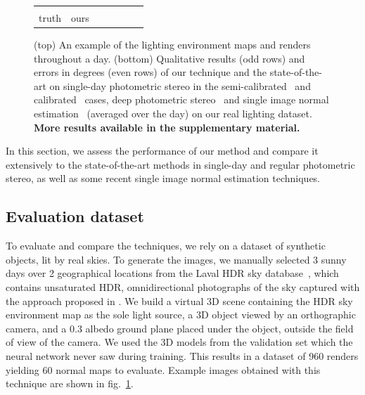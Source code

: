 \begin{figure}
\begin{tabular*}{\linewidth}{@{}c@{}c@{}c@{}c@{}c@{}c@{}c@{}}
\begin{tabular}{@{}c@{}}ground\\truth\end{tabular} & ours & \cite{jung-cvpr-15} & \cite{yu-iccp-13} & \cite{santo-iccv-17} & \cite{wu-nips-17} & \cite{eigen-iccv-15} \\
\end{tabular*}
\egroup
\caption{(top) An example of the lighting environment maps and renders throughout a day. (bottom) Qualitative results (odd rows) and errors in degrees (even rows) of our technique and the state-of-the-art on single-day photometric stereo in the semi-calibrated~\cite{jung-cvpr-15} and calibrated~\cite{yu-iccp-13} cases, deep photometric stereo~\cite{santo-iccv-17} and single image normal estimation~\cite{wu-nips-17,eigen-iccv-15} (averaged over the day) on our real lighting dataset. \textbf{More results available in the supplementary material.}}
\label{fig:results-qualitative}
\end{figure}


In this section, we assess the performance of our method and compare it extensively to the state-of-the-art methods in single-day and regular photometric stereo, as well as some recent single image normal estimation techniques.

\subsection{Evaluation dataset}
\label{sec:evaluation_dataset}

To evaluate and compare the techniques, we rely on a dataset of synthetic objects, lit by real skies. To generate the images, we manually selected 3 sunny days over 2 geographical locations from the Laval HDR sky database~\cite{hdrdb}, which contains unsaturated HDR, omnidirectional photographs of the sky captured with the approach proposed in \cite{stumpfel-afrigraph-04}. We build a virtual 3D scene containing the HDR sky environment map as the sole light source, a 3D object viewed by an orthographic camera, and a 0.3 albedo ground plane placed under the object, outside the field of view of the camera. We used the 3D models from the validation set which the neural network never saw during training. This results in a dataset of 960 renders yielding 60 normal maps to evaluate. Example images obtained with this technique are shown in fig.~\ref{fig:results-qualitative}. 


